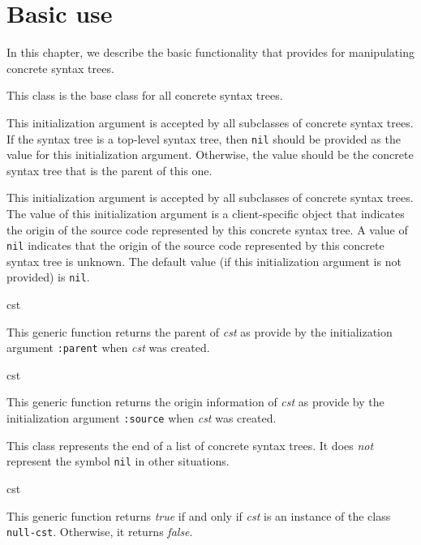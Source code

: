 \chapter{Basic use}

In this chapter, we describe the basic functionality that \sysname{}
provides for manipulating concrete syntax trees.


This class is the base class for all concrete syntax trees.


This initialization argument is accepted by all subclasses of concrete
syntax trees.  If the syntax tree is a top-level syntax tree, then
\texttt{nil} should be provided as the value for this initialization
argument.  Otherwise, the value should be the concrete syntax tree
that is the parent of this one.


This initialization argument is accepted by all subclasses of concrete
syntax trees.  The value of this initialization argument is a
client-specific object that indicates the origin of the source code
represented by this concrete syntax tree.  A value of \texttt{nil}
indicates that the origin of the source code represented by this concrete
syntax tree is unknown.  The default value (if this initialization
argument is not provided) is \texttt{nil}.

 {cst}

This generic function returns the parent of \textit{cst} as provide by
the initialization argument \texttt{:parent} when \textit{cst} was
created.

 {cst}

This generic function returns the origin information of \textit{cst}
as provide by the initialization argument \texttt{:source} when
\textit{cst} was created.


This class represents the end of a list of concrete syntax trees.  It
does \emph{not} represent the \commonlisp{} symbol \texttt{nil} in
other situations.

 {cst}

This generic function returns \emph{true} if and only if \textit{cst}
is an instance of the class \texttt{null-cst}.  Otherwise, it returns
\emph{false}.


